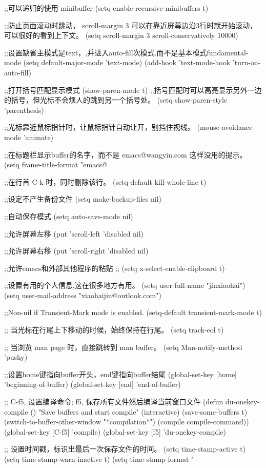 \begin{emacscode}
;;可以递归的使用 minibuffer
(setq enable-recursive-minibuffers t)

;;防止页面滚动时跳动， scroll-margin 3 可以在靠近屏幕边沿3行时就开始滚动，可以很好的看到上下文。
(setq scroll-margin 3 scroll-conservatively 10000)

;;设置缺省主模式是text，,并进入auto-fill次模式.而不是基本模式fundamental-mode
(setq default-major-mode 'text-mode)
(add-hook 'text-mode-hook 'turn-on-auto-fill)

;;打开括号匹配显示模式
(show-paren-mode t)
;;括号匹配时可以高亮显示另外一边的括号，但光标不会烦人的跳到另一个括号处。
(setq show-paren-style 'parenthesis)

;;光标靠近鼠标指针时，让鼠标指针自动让开，别挡住视线。
(mouse-avoidance-mode 'animate)

;;在标题栏显示buffer的名字，而不是 emacs@wangyin.com 这样没用的提示。
(setq frame-title-format "emacs@%

;;在行首 C-k 时，同时删除该行。
(setq-default kill-whole-line t)

;;设定不产生备份文件
(setq make-backup-files nil)

;;自动保存模式
(setq auto-save-mode nil)

;;允许屏幕左移
(put 'scroll-left 'disabled nil)

;;允许屏幕右移
(put 'scroll-right 'disabled nil)


;;允许emacs和外部其他程序的粘贴
;; (setq x-select-enable-clipboard t)

;;设置有用的个人信息,这在很多地方有用。
(setq user-full-name "jinxiaohai")
(setq user-mail-address "xiaohaijin@outlook.com")

;;Non-nil if Transient-Mark mode is enabled.
(setq-default transient-mark-mode t)

;; 当光标在行尾上下移动的时候，始终保持在行尾。
(setq track-eol t)

;; 当浏览 man page 时，直接跳转到 man buffer。
(setq Man-notify-method 'pushy)

;;设置home键指向buffer开头，end键指向buffer结尾
(global-set-key [home] 'beginning-of-buffer)
(global-set-key [end] 'end-of-buffer)

;; C-f5, 设置编译命令; f5, 保存所有文件然后编译当前窗口文件
(defun du-onekey-compile ()
  "Save buffers and start compile"
  (interactive)
  (save-some-buffers t)
  (switch-to-buffer-other-window "*compilation*")
  (compile compile-command))
(global-set-key [C-f5] 'compile)
(global-set-key [f5] 'du-onekey-compile)

;; 设置时间戳，标识出最后一次保存文件的时间。
(setq time-stamp-active t)
(setq time-stamp-warn-inactive t)
(setq time-stamp-format "%


\end{emacscode}
